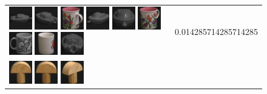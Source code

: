 \begin{figure}[!bp]
\begin{tabular}{m{11cm} | m{3cm} |}
\includegraphics[width=1cm]{coil/beeld-25.eps}
\includegraphics[width=1cm]{coil/beeld-28.eps}
\includegraphics[width=1cm]{coil/beeld-10.eps}
\includegraphics[width=1cm]{coil/beeld-27.eps}
\includegraphics[width=1cm]{coil/beeld-26.eps}
\includegraphics[width=1cm]{coil/beeld-9.eps}
\includegraphics[width=1cm]{coil/beeld-49.eps}
\includegraphics[width=1cm]{coil/beeld-38.eps}
\includegraphics[width=1cm]{coil/beeld-29.eps}
& {\scriptsize 0.014285714285714285}
\\
\includegraphics[width=1cm]{coil/beeld-0.eps}
\includegraphics[width=1cm]{coil/beeld-1.eps}
\includegraphics[width=1cm]{coil/beeld-3.eps}

\end{tabular}
\end{figure}
